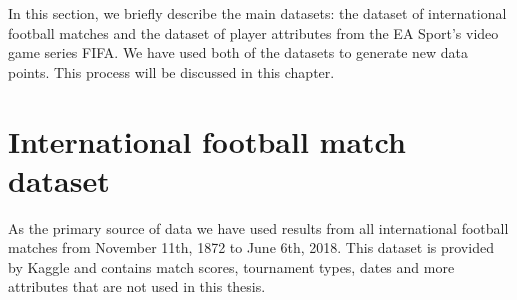 In this section, we briefly describe the main datasets: the dataset of international football matches and the dataset of player attributes from the EA Sport's video game series FIFA. We have used both of the datasets to generate new data points. This process will be discussed in this chapter.

\section{International football match dataset}
As the primary source of data we have used results from all international football matches from November 11th, 1872 to June 6th, 2018. This dataset is provided by Kaggle \cite{matchdb} and contains match scores, tournament types, dates and more attributes that are not used in this thesis.

